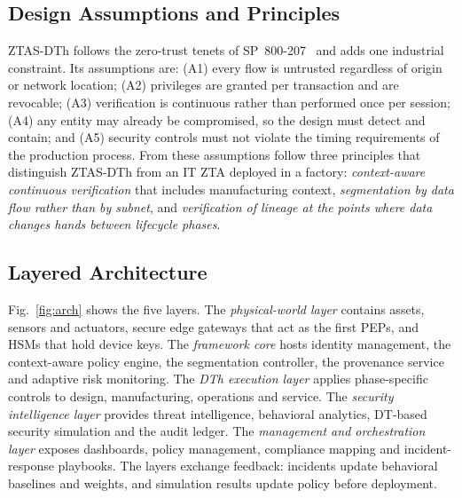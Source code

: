 \documentclass[journal]{IEEEtran}
\newcommand{\ztas}{ZTAS-DTh}
\begin{document}
\subsection{Design Assumptions and Principles}
\ztas{} follows the zero-trust tenets of SP~800-207~\cite{rose2020zta} and adds one industrial constraint. Its assumptions are: (A1) every flow is untrusted regardless of origin or network location; (A2) privileges are granted per transaction and are revocable; (A3) verification is continuous rather than performed once per session; (A4) any entity may already be compromised, so the design must detect and contain; and (A5) security controls must not violate the timing requirements of the production process. From these assumptions follow three principles that distinguish \ztas{} from an IT ZTA deployed in a factory: \emph{context-aware continuous verification} that includes manufacturing context, \emph{segmentation by data flow rather than by subnet}, and \emph{verification of lineage at the points where data changes hands between lifecycle phases}.

\subsection{Layered Architecture}
Fig.~\ref{fig:arch} shows the five layers. The \emph{physical-world layer} contains assets, sensors and actuators, secure edge gateways that act as the first PEPs, and HSMs that hold device keys. The \emph{framework core} hosts identity management, the context-aware policy engine, the segmentation controller, the provenance service and adaptive risk monitoring. The \emph{DTh execution layer} applies phase-specific controls to design, manufacturing, operations and service. The \emph{security intelligence layer} provides threat intelligence, behavioral analytics, DT-based security simulation and the audit ledger. The \emph{management and orchestration layer} exposes dashboards, policy management, compliance mapping and incident-response playbooks. The layers exchange feedback: incidents update behavioral baselines and weights, and simulation results update policy before deployment.
\end{document}
